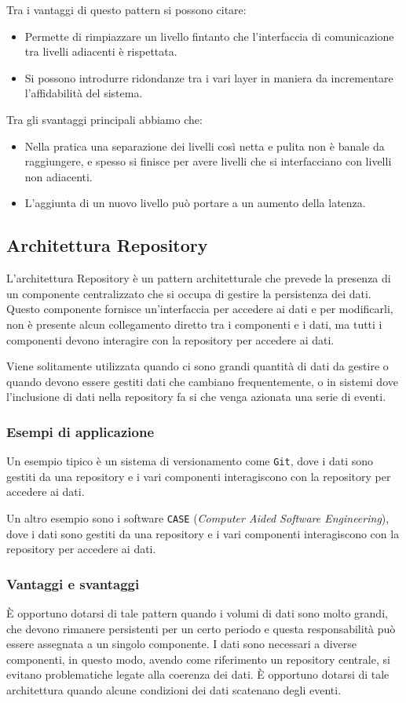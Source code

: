 Tra i vantaggi di questo pattern si possono citare:
\begin{itemize}
    \item Permette di rimpiazzare un livello fintanto che l'interfaccia di comunicazione 
    tra livelli adiacenti è rispettata.
    \item Si possono introdurre ridondanze tra i vari layer in maniera da incrementare 
    l'affidabilità del sistema.
\end{itemize}
Tra gli svantaggi principali abbiamo che:
\begin{itemize}
    \item Nella pratica una separazione dei livelli così netta e pulita non 
    è banale da raggiungere, e spesso si finisce per avere livelli che si
    interfacciano con livelli non adiacenti.
    \item L'aggiunta di un nuovo livello può portare a un aumento della latenza.
\end{itemize}
\subsection{Architettura Repository}
L'architettura Repository è un pattern architetturale che prevede la presenza di un
componente centralizzato che si occupa di gestire la persistenza dei dati.
Questo componente fornisce un'interfaccia per accedere ai dati e per modificarli, non 
è presente alcun collegamento diretto tra i componenti e i dati, ma tutti i componenti
devono interagire con la repository per accedere ai dati.

Viene solitamente utilizzata quando ci sono grandi quantità di dati da gestire o
quando devono essere gestiti dati che cambiano frequentemente, o in sistemi dove 
l'inclusione di dati nella repository fa si che venga azionata una serie di
eventi.

\subsubsection{Esempi di applicazione}
Un esempio tipico è un sistema di versionamento come \texttt{Git}, dove i dati sono
gestiti da una repository e i vari componenti interagiscono con la repository per
accedere ai dati.

Un altro esempio sono i software \texttt{CASE} (\textit{Computer Aided Software Engineering}),
dove i dati sono gestiti da una repository e i vari componenti interagiscono con la
repository per accedere ai dati.

\subsubsection{Vantaggi e svantaggi}
È opportuno dotarsi di tale pattern quando i volumi di dati sono molto grandi, che 
devono rimanere persistenti per un certo periodo e questa responsabilità può essere
assegnata a un singolo componente. I dati sono necessari a diverse componenti, in questo 
modo, avendo come riferimento un repository centrale, si evitano problematiche legate 
alla coerenza dei dati.
È opportuno dotarsi di tale architettura quando alcune condizioni dei dati
scatenano degli eventi.

